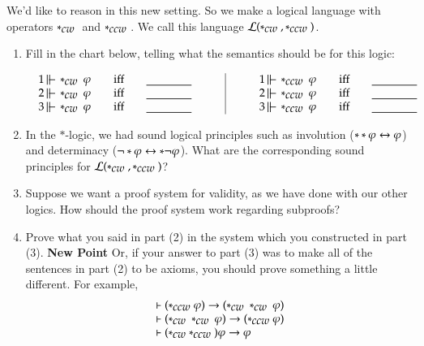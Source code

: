 \documentclass[12pt]{article}
\newcommand{\sw}{*}
\begin{document}
\newcommand{\ccw}{\sw_{\mbox{\em ccw}\ }}




We'd like to reason in this new setting.   So we make a logical language with operators 
$\cw$ and $\ccw$.   We call this language $\lang(\cw,\ccw)$.  

\begin{enumerate}
\item Fill in the chart below, telling what the semantics should be for this logic:

$$\begin{array}{l|l}
\begin{array}{lcl}
1\forces \cw\phi & \quadiff& \underline{\qquad\qquad}\\
2\forces \cw\phi & \quadiff& \underline{\qquad\qquad} \\
3\forces \cw\phi & \quadiff&\underline{\qquad\qquad} \\
\end{array}
\quad \quad & \quad \quad
\begin{array}{lcl}
1\forces \ccw\phi & \quadiff& \underline{\qquad\qquad} \\
2\forces \ccw\phi & \quadiff&\underline{\qquad\qquad} \\
3\forces \ccw\phi & \quadiff&\underline{\qquad\qquad} \\
\end{array}  \\
\end{array}
$$



\item
In the $\sw$-logic, we had sound logical principles such as
involution ($ \sw\sw\phi\iiff \phi$) and determinacy ($\nott\sw\phi\iiff\sw\nott\phi$).
What are the corresponding sound principles for  $\lang(\cw,\ccw)$?


\item   Suppose we want a proof system for validity, as we have done with our other logics.
How should the proof system work regarding subproofs?

\item Prove what you said in part (2) in the system which you constructed in part (3).
 {\bf New Point}
 Or, if your answer to part (3) was to make all of the sentences in part (2) to be axioms,
 you should prove something a little different.   For example,
 \[
\begin{array}{l}
 \proves (\ccw \phi) \iif (\cw\cw \phi) \\
  \proves (\cw\cw \phi) \iif (\ccw \phi)  \\
\proves (\cw\ccw)\phi \iif \phi\\
\end{array}
\]
 



\end{enumerate}
\end{document}
